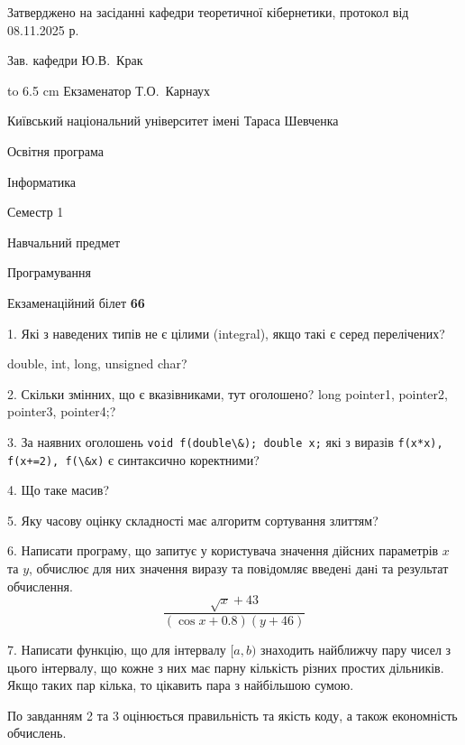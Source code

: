 \documentclass[12pt, ukrainian]{article}
\def\code#1{\Verb!#1!}
\begin{document}
{\smallskip\smallskip \begin {scriptsize} Затверджено на засіданні кафедри теоретичної кібернетики, протокол   від   08.11.2025 р.\par\smallskip\smallskip\smallskip\smallskip
{\parbox {6.5 cm} {Зав. кафедри \dotfill Ю.В.~Крак}}\hspace {0.7cm} {\hbox to 6.5 cm { Екзаменатор \dotfill Т.О.~Карнаух}} \end{scriptsize}}
\vspace{0.9cm}
{{\begin {scriptsize}\par
{ \center  Київський національний університет імені Тараса Шевченка \par}
{\parbox {5 cm}{Освітня програма \hfill}{\parbox {7 cm}{Інформатика\hfill}}\parbox {6 cm}{\hfill Семестр 1}}\par
{\parbox {5 cm} {Навчальний предмет \hfill}\parbox {7 cm}{Програмування \hfill}\parbox {6cm}{\hfill}\par}\vspace{-15pt} \end{scriptsize}}{\center Екзаменаційний білет \No \textbf { 66 }\par}}
{%
1. Які з наведених типів не є цілими (integral), якщо такі є серед перелічених?

double, int, long, unsigned char?
\par
\vspace{2mm}
2. Скільки змінних, що є вказівниками, тут оголошено?
long pointer1, pointer2, pointer3, pointer4;?
\par
\vspace{2mm}
3. За наявних оголошень \code{void f(double\&); double x;} які з виразів \code{f(x*x), f(x+=2), f(\&x)} є синтаксично коректними?
\par
\vspace{2mm}
4. Що таке масив?
\par
\vspace{2mm}
5. Яку часову оцінку складності має алгоритм сортування злиттям?
\par
\vspace{2mm}
6. Написати програму, що запитує у користувача значення дійсних параметрів $x$ та $y$, обчислює для них значення виразу та повiдомляє введенi данi та результат обчислення.
$$\frac{\sqrt x + 43}{(\cos x + 0.8) (y + 46)}$$ 

\par
7. Написати функцію, що для інтервалу $[a, b)$ знаходить найближчу пару чисел з цього інтервалу, що кожне з них має парну кількість різних простих дільників. Якщо таких пар кілька, то цікавить пара з найбільшою сумою.

По завданням 2 та 3 оцінюється правильність та якість коду, а також економність обчислень.

}
\end{document}
